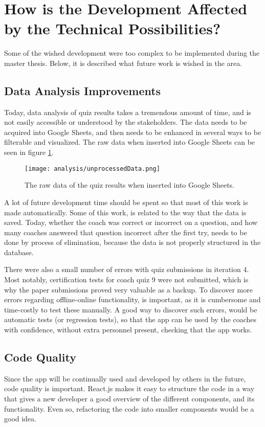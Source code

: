 \section{How is the Development Affected by the Technical Possibilities?}\label{rq1}

Some of the wished development were too complex to be implemented during the master thesis. Below, it is described what future work is wished in the area.

\subsection{Data Analysis Improvements}
Today, data analysis of quiz results takes a tremendous amount of time, and is not easily accessible or understood by the stakeholders. The data needs to be acquired into Google Sheets, and then needs to be enhanced in several ways to be filterable and visualized. The raw data when inserted into Google Sheets can be seen in figure \ref{fig:unprocessedData}.

\begin{figure}[h]
  \centering
  \texttt{[image: analysis/unprocessedData.png]}
  \caption{The raw data of the quiz results when inserted into Google Sheets.}
  \label{fig:unprocessedData}
\end{figure}

A lot of future development time should be spent so that most of this work is made automatically. Some of this work, is related to the way that the data is saved. Today, whether the coach was correct or incorrect on a question, and how many coaches answered that question incorrect after the first try, needs to be done by process of elimination, because the data is not properly structured in the database.

There were also a small number of errors with quiz submissions in iteration 4. Most notably, certification tests for coach quiz 9 were not submitted, which is why the paper submissions proved very valuable as a backup. To discover more errors regarding offline-online functionality, is important, as it is cumbersome and time-costly to test these manually. A good way to discover such errors, would be automatic tests (or regression tests), so that the app can be used by the coaches with confidence, without extra personnel present, checking that the app works.

\subsection{Code Quality}
Since the app will be continually used and developed by others in the future, code quality is important. React.js makes it easy to structure the code in a way that gives a new developer a good overview of the different components, and its functionality. Even so, refactoring the code into smaller components would be a good idea.


